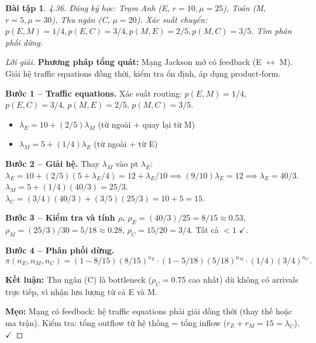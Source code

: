 \documentclass[8pt,a4paper]{article}
\newtheorem{exercise}{Bài tập}
\newenvironment{solution}{\begin{proof}[Lời giải]}{\end{proof}}
\begin{document}
\begin{exercise}
4.36. Đăng ký học: Trạm Anh (E, $r=10, \mu=25$), Toán (M, $r=5, \mu=30$), Thu ngân (C, $\mu=20$).
Xác suất chuyển: $p(E,M)=1/4, p(E,C)=3/4, p(M,E)=2/5, p(M,C)=3/5$. Tìm phân phối dừng.
\end{exercise}
\begin{solution}
\textbf{Phương pháp tổng quát:} Mạng Jackson mở có feedback (E $\leftrightarrow$ M). Giải hệ traffic equations đồng thời, kiểm tra ổn định, áp dụng product-form.

\textbf{Bước 1 -- Traffic equations.} Xác suất routing: $p(E,M) = 1/4$, $p(E,C) = 3/4$, $p(M,E) = 2/5$, $p(M,C) = 3/5$.
\begin{itemize}[nosep]
\item $\lambda_E = 10 + (2/5)\lambda_M$ \quad (từ ngoài + quay lại từ M)
\item $\lambda_M = 5 + (1/4)\lambda_E$ \quad (từ ngoài + từ E)
\end{itemize}

\textbf{Bước 2 -- Giải hệ.} Thay $\lambda_M$ vào pt $\lambda_E$:
$\lambda_E = 10 + (2/5)(5 + \lambda_E/4) = 12 + \lambda_E/10 \implies (9/10)\lambda_E = 12 \implies \lambda_E = 40/3$.
$\lambda_M = 5 + (1/4)(40/3) = 25/3$.
$\lambda_C = (3/4)(40/3) + (3/5)(25/3) = 10 + 5 = 15$.

\textbf{Bước 3 -- Kiểm tra và tính $\rho$.}
$\rho_E = (40/3)/25 = 8/15 \approx 0.53$, $\rho_M = (25/3)/30 = 5/18 \approx 0.28$, $\rho_C = 15/20 = 3/4$. Tất cả $< 1$ $\checkmark$.

\textbf{Bước 4 -- Phân phối dừng.}
\[
\boxed{\pi(n_E, n_M, n_C) = (1-8/15)(8/15)^{n_E} \cdot (1-5/18)(5/18)^{n_M} \cdot (1/4)(3/4)^{n_C}}.
\]

\textbf{Kết luận:} Thu ngân (C) là bottleneck ($\rho_C = 0.75$ cao nhất) dù không có arrivals trực tiếp, vì nhận lưu lượng từ cả E và M.

\textbf{Mẹo:} Mạng có feedback: hệ traffic equations phải giải đồng thời (thay thế hoặc ma trận). Kiểm tra: tổng outflow từ hệ thống = tổng inflow ($r_E + r_M = 15 = \lambda_C$). $\checkmark$
\end{solution}
\end{document}
